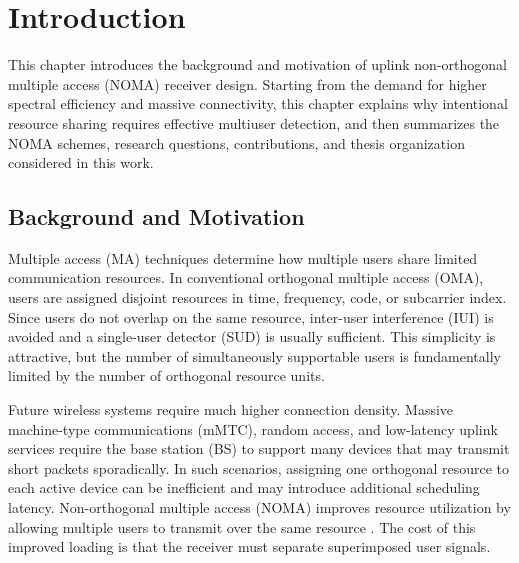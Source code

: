 \chapter{Introduction}

This chapter introduces the background and motivation of uplink non-orthogonal multiple access (NOMA) receiver design. Starting from the demand for higher spectral efficiency and massive connectivity, this chapter explains why intentional resource sharing requires effective multiuser detection, and then summarizes the NOMA schemes, research questions, contributions, and thesis organization considered in this work.

\section{Background and Motivation}

Multiple access (MA) techniques determine how multiple users share limited communication resources. In conventional orthogonal multiple access (OMA), users are assigned disjoint resources in time, frequency, code, or subcarrier index. Since users do not overlap on the same resource, inter-user interference (IUI) is avoided and a single-user detector (SUD) is usually sufficient. This simplicity is attractive, but the number of simultaneously supportable users is fundamentally limited by the number of orthogonal resource units.

Future wireless systems require much higher connection density. Massive machine-type communications (mMTC), random access, and low-latency uplink services require the base station (BS) to support many devices that may transmit short packets sporadically. In such scenarios, assigning one orthogonal resource to each active device can be inefficient and may introduce additional scheduling latency. Non-orthogonal multiple access (NOMA) improves resource utilization by allowing multiple users to transmit over the same resource \cite{islam2016pdnoma,dai2018noma}. The cost of this improved loading is that the receiver must separate superimposed user signals.

